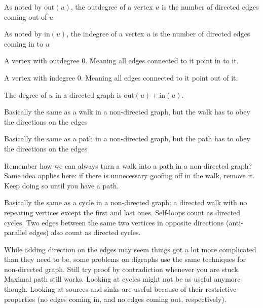 \documentclass[11pt]{scrartcl}
\begin{document}
\begin{definition}[Outdegree]
As noted by $\text{out}(u)$, the outdegree of a vertex $u$ is the number of directed edges coming out of $u$
\end{definition}

\begin{definition}[Indegree]
As noted by $\text{in}(u)$, the indegree of a vertex $u$ is the number of directed edges coming in to $u$
\end{definition}

\begin{definition}[Sink]
A vertex with outdegree 0. Meaning all edges connected to it point in to it.
\end{definition}

\begin{definition}[Source]
A vertex with indegree 0. Meaning all edges connected to it point out of it.
\end{definition}

The degree of $u$ in a directed graph is $\text{out}(u) + \text{in}(u)$.

\begin{definition}
Basically the same as a walk in a non-directed graph, but the walk has to obey the directions on the edges
\end{definition}

\begin{definition}
Basically the same as a path in a non-directed graph, but the path has to obey the directions on the edges
\end{definition}

Remember how we can always turn a walk into a path in a non-directed graph? Same idea applies here: if there is unnecessary goofing off in the walk, remove it. Keep doing so until you have a path.

\begin{definition}
Basically the same as a cycle in a non-directed graph: a directed walk with no repeating vertices except the first and last ones. Self-loops count as directed cycles. Two edges between the same two vertices in opposite directions (anti-parallel edges) also count as directed cycles.
\end{definition}

\begin{advice}
While adding direction on the edges may seem things got a lot more complicated than they need to be, some problems on digraphs use the same techniques for non-directed graph. Still try proof by contradiction whenever you are stuck. Maximal path still works. Looking at cycles might not be as useful anymore though. Looking at sources and sinks are useful because of their restrictive properties (no edges coming in, and no edges coming out, respectively).
\end{advice}
\end{document}
